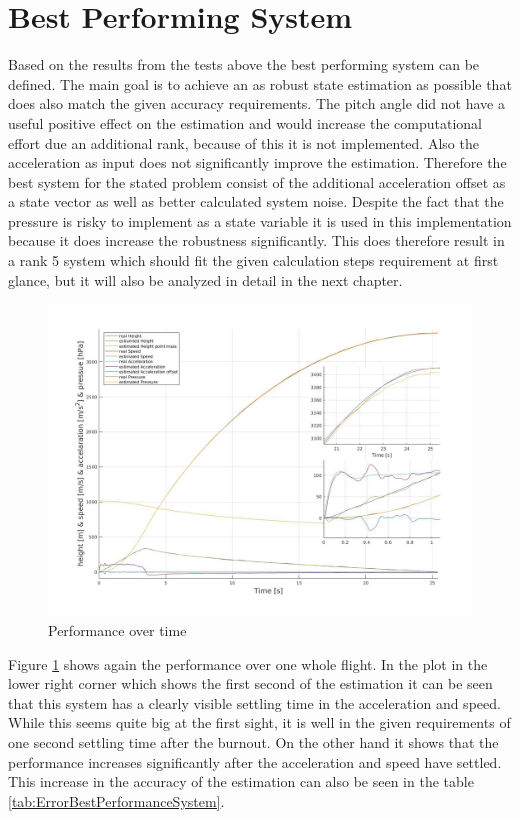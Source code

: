 \section{Best Performing System}
Based on the results from the tests above the best performing system can be defined.
The main goal is to achieve an as robust state estimation as possible that does also match the given accuracy requirements.
The pitch angle did not have a useful positive effect on the estimation and would increase the computational effort due an additional rank, because of this it is not implemented.
Also the acceleration as input does not significantly improve the estimation.
Therefore the best system for the stated problem consist of the additional acceleration offset as a state vector as well as better calculated system noise.
Despite the fact that the pressure is risky to implement as a state variable it is used in this implementation because it does increase the robustness significantly.
This does therefore result in a rank 5 system which should fit the given calculation steps requirement at first glance, but it will also be analyzed in detail in the next chapter.

\begin{figure}[h!]
 \centering
 \includegraphics[width=.8\textwidth]{./Pictures/BestSystemPerformance.jpg}
 \caption{Performance over time}
 \label{fig:BestSystemPerformance}
\end{figure}

Figure \ref{fig:BestSystemPerformance} shows again the performance over one whole flight.
In the plot in the lower right corner which shows the first second of the estimation it can be seen that this system has a clearly visible settling time in the acceleration and speed.
While this seems quite big at the first sight, it is well in the given requirements of one second settling time after the burnout.
On the other hand it shows that the performance increases significantly after the acceleration and speed have settled.
This increase in the accuracy of the estimation can also be seen in the table \ref{tab:ErrorBestPerformanceSystem}.

